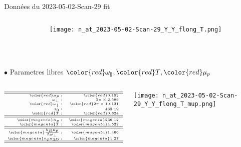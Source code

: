 \begin{frame}[shrink=1]{Données du 2023-05-02-Scan-29  fit }
{\begin{columns}
\begin{column}{0.3\linewidth}
		\end{column}
		
		\begin{column}{0.7\linewidth}
			\centering
			\texttt{[image: n\_at\_2023-05-02-Scan-29\_Y\_Y\_flong\_T.png]}	
		\end{column}


		
	\end{columns}
		
	{~}\\
	{~}\\
	{$\bullet$ Parametres libres ${\color{red} \omega_\parallel} , {\color{red} T}  , {\color{red} \mu_p} $ }

	\begin{columns}
	
		\begin{column}{0.3\linewidth}
			$$ 
			{\tiny
			\begin{array}{rrl}
				\hline
				\hline
				{\color{red} \mu_p :}   & {\color{red} 0.182 }  & {\color{red} \mu K}\\
				\omega_\perp :  & 2 \pi  \times  2.589  & kHz	\\
				{\color{red} \omega_\parallel :}  & {\color{red} 2 \pi  \times 10.131}  & {\color{red} Hz	}\\
				z_0 :  &  462.19  & \mu m	\\
				{\color{red} T : } & {\color{red} 0.824  } & {\color{red} \mu K}\\			
				\hline
				\hline
				{\color{magenta} n_p :  } & {\color{magenta} 239.12}  & {\color{magenta}{\mu m}^{-1}}\\	
				{\color{magenta} T : } & {\color{magenta} 4.522  } & {\color{magenta}\mu_p} \\				
				\hline
				\hline	
				{\color{magenta} \frac{ k_B \mu_p}{\hbar \omega_\perp } : } & {\color{magenta} 1.466}  & \\
				{\color{magenta} n_p a_{3D} : }  & {\color{magenta}  1.27}  &  \\
				\hline
				\hline	
			\end{array}
			}
			$$


		\end{column}
		
		\begin{column}{0.7\linewidth}
			\centering
			\texttt{[image: n\_at\_2023-05-02-Scan-29\_Y\_Y\_flong\_T\_mup.png]}	
		\end{column}



\end{columns}}
\end{frame}
